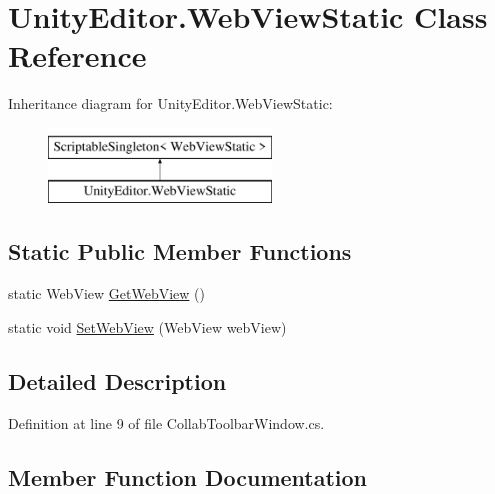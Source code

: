 \hypertarget{class_unity_editor_1_1_web_view_static}{}\section{Unity\+Editor.\+Web\+View\+Static Class Reference}
\label{class_unity_editor_1_1_web_view_static}
Inheritance diagram for Unity\+Editor.\+Web\+View\+Static\+:\begin{figure}[H]
\begin{center}
\leavevmode
\includegraphics[height=2.000000cm]{class_unity_editor_1_1_web_view_static}
\end{center}
\end{figure}
\subsection*{Static Public Member Functions}
\begin{DoxyCompactItemize}
\item 
static Web\+View \mbox{\hyperlink{class_unity_editor_1_1_web_view_static_ac6db6d67b2357c3b875980377e954720}{Get\+Web\+View}} ()
\item 
static void \mbox{\hyperlink{class_unity_editor_1_1_web_view_static_aa02b3cff0fabf2f7ebf05c4bd402f977}{Set\+Web\+View}} (Web\+View web\+View)
\end{DoxyCompactItemize}


\subsection{Detailed Description}


Definition at line 9 of file Collab\+Toolbar\+Window.\+cs.



\subsection{Member Function Documentation}
\mbox{\label{class_unity_editor_1_1_web_view_static_ac6db6d67b2357c3b875980377e954720}} 
